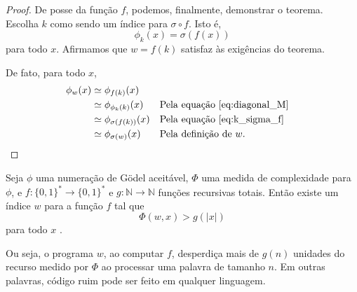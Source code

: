 \begin{proof}
    De posse da função $f$,
    podemos, finalmente, demonstrar o teorema.
    Escolha $k$ como sendo um índice para $\sigma \circ f$.
    Isto é,
    \begin{equation}
        \phi_k(x) = \sigma(f(x))
        \label{eq:k_sigma_f}
    \end{equation}
    para todo $x$.
    Afirmamos que $w = f(k)$
    satisfaz às exigências do teorema.

    De fato, para todo $x$,
    \begin{align*}
        \phi_w(x) &\simeq \phi_{f(k)}(x) \\
              &\simeq \phi_{\phi_k(k)}(x) && \text{Pela equação~\ref{eq:diagonal_M}}\\
              &\simeq \phi_{\sigma(f(k))}(x) && \text{Pela equação~\ref{eq:k_sigma_f}}\\
              &\simeq \phi_{\sigma(w)}(x) && \text{Pela definição de $w$.}
    \end{align*}
\end{proof}

\begin{proposition}
    Seja $\phi$ uma numeração de Gödel aceitável,
    $\Phi$ uma medida de complexidade para $\phi$,
    e $f: \{0, 1\}^* \to \{0, 1\}^*$ e $g: \mathbb N \to \mathbb N$
    funções recursivas totais.
    Então existe um índice $w$ para a função $f$ tal que
    \begin{equation*}
        \Phi(w, x) > g(|x|)
    \end{equation*}
    para todo $x$
    \textup{\cite[p.~324]{Blum1967}}.
    \label{thm:resource_waste}
\end{proposition}

Ou seja,
o programa $w$, ao computar $f$,
desperdiça mais de $g(n)$ unidades do recurso medido por $\Phi$
ao processar uma palavra de tamanho $n$.
Em outras palavras,
código ruim pode ser feito em qualquer linguagem.

